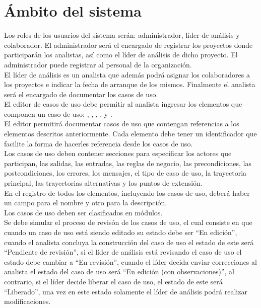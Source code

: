 \section{Ámbito del sistema}
Los roles de los usuarios del sistema serán: administrador, líder de análisis y colaborador. El administrador será el encargado 
de registrar los proyectos donde participarán los analistas, así como el líder de análisis de dicho proyecto. El administrador puede
registrar al personal de la organización.\\

El líder de análisis es un analista que además podrá asignar los colaboradores a los proyectos e indicar la fecha de arranque de los mismos. Finalmente
el analista será el encargado de documentar los casos de uso.\\

El editor de casos de uso debe permitir al analista ingresar los elementos que componen un caso de uso: , , 
, ,  y .\\

El editor permitirá documentar casos de uso que contengan referencias a los elementos descritos anteriormente.
Cada elemento debe tener un identificador que facilite la forma de hacerles referencia desde los casos de uso.\\

Los casos de uso deben contener secciones para especificar los actores que participan, las salidas, las entradas, las reglas de negocio,
las precondiciones, las postcondiciones, los errores, los mensajes, el tipo de
caso de uso, la trayectoria principal, las trayectorias alternativas y los puntos de extensión.\\

En el registro de todos los elementos, incluyendo los casos de uso, deberá haber un campo para el nombre y otro para la descripción.\\

Los casos de uso deben ser clasificados en módulos.\\

Se debe simular el proceso de revisón de los casos de uso, el cual consiste en que cuando un caso de uso está siendo editado su estado debe ser ``En edición'', cuando 
el analista concluya la construcción del caso de uso el estado de este será ``Pendiente de revisión'', si el líder de análisis está revisando el caso de uso el estado 
debe cambiar a ``En revisión'', cuando el líder decida enviar correcciones al analista el estado del caso de uso será ``En edición (con observaciones)'', al contrario, 
si el líder decide liberar el caso de uso, el estado de este será ``Liberado'', una vez en este estado solamente el líder de análisis podrá realizar modificaciones.\\


